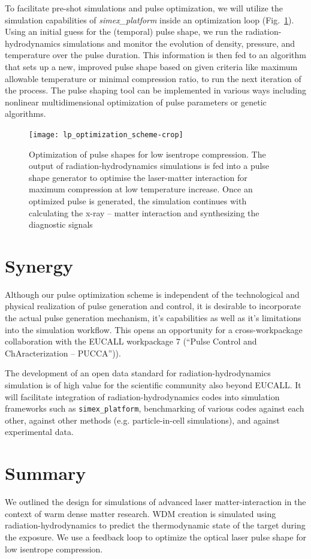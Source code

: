 \documentclass[12pt]{scrartcl}
\begin{document}
To facilitate pre-shot simulations and pulse optimization, we will utilize the
simulation capabilities of \textit{simex\_platform} inside an optimization loop (Fig.~\ref{fig:lp_optimization_schem}).
Using an initial guess for the (temporal) pulse shape, we run the
radiation-hydrodynamics simulations and monitor the evolution of density,
pressure, and temperature over the pulse duration. This information is then fed
to an algorithm that sets up a new, improved pulse shape based on given criteria
like maximum allowable temperature or minimal compression ratio, to run the next
iteration of the process.
The pulse shaping tool can be implemented in various
ways including nonlinear multidimensional optimization of pulse parameters or genetic algorithms.

\begin{figure}[ht]
  \begin{center}
    \texttt{[image: lp\_optimization\_scheme-crop]}
  \end{center}
  \caption{Optimization of pulse shapes for low isentrope compression. The
  output of radiation-hydrodynamics simulations is fed into a pulse shape
generator to optimise the laser-matter interaction for maximum compression at
low temperature increase. Once an optimized pulse is generated, the simulation
continues with calculating the x-ray -- matter interaction and synthesizing the
diagnostic signals}
  \label{fig:lp_optimization_schem}
\end{figure}

\section{Synergy}

Although our pulse optimization scheme is  independent of the technological and
physical realization of pulse generation and control, it is desirable to
incorporate the actual pulse generation mechanism, it's capabilities as well as
it's limitations into the simulation workflow.  This opens an opportunity for
a cross-workpackage collaboration with the EUCALL workpackage 7 (``Pulse Control and
ChAracterization -- PUCCA'')).

The development of an open data standard for radiation-hydrodynamics simulation is of high value for the scientific community
also beyond EUCALL. It will facilitate integration of radiation-hydrodynamics codes into simulation frameworks such as
\texttt{simex\_platform}, benchmarking of various codes against each other, against other methods (e.g. particle-in-cell simulations), and
against experimental data.

\section{Summary}
We outlined the design for simulations of advanced laser matter-interaction in the context of warm dense matter research. WDM creation is
simulated using radiation-hydrodynamics to predict the thermodynamic state of the target during the exposure. We use a feedback loop
to optimize the optical laser pulse shape for low isentrope compression.


\printbibliography
\end{document}
